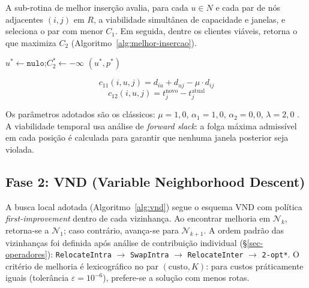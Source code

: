 \documentclass[10pt, a4paper]{article}
\begin{document}
A sub-rotina de melhor inser\c{c}\~ao avalia, para cada $u \in N$ e cada par de n\'os adjacentes $(i, j)$ em $R$, a viabilidade simult\^anea de capacidade e janelas, e seleciona o par com menor $C_1$. Em seguida, dentre os clientes vi\'aveis, retorna o que maximiza $C_2$ (Algoritmo~\ref{alg:melhor-insercao}).

\begin{algorithm}[H]
\caption{MelhorInser\c{c}\~ao --- Sub-rotina I1}
\label{alg:melhor-insercao}
$u^* \leftarrow \texttt{nulo}$;\quad $C_2^* \leftarrow -\infty$\;
\Return $(u^*, p^*)$\;
\end{algorithm}

\begin{equation}
c_{11}(i,u,j) = d_{iu} + d_{uj} - \mu \cdot d_{ij}
\label{eq:c11}
\end{equation}
\begin{equation}
c_{12}(i,u,j) = t_j^\text{novo} - t_j^\text{atual}
\label{eq:c12}
\end{equation}

Os par\^ametros adotados s\~ao os cl\'assicos: $\mu = 1{,}0$, $\alpha_1 = 1{,}0$, $\alpha_2 = 0{,}0$, $\lambda = 2{,}0$ \citep{solomon1987}. A viabilidade temporal usa an\'alise de \emph{forward slack}: a folga m\'axima admiss\'ivel em cada posi\c{c}\~ao \'e calculada para garantir que nenhuma janela posterior seja violada.

\subsection{Fase 2: VND (Variable Neighborhood Descent)}
\label{sec-vnd}

A busca local adotada (Algoritmo~\ref{alg:vnd}) segue o esquema VND \citep{hansen2001} com pol\'itica \emph{first-improvement} dentro de cada vizinhan\c{c}a. Ao encontrar melhoria em $\mathcal{N}_k$, retorna-se a $\mathcal{N}_1$; caso contr\'ario, avan\c{c}a-se para $\mathcal{N}_{k+1}$. A ordem padr\~ao das vizinhan\c{c}as foi definida ap\'os an\'alise de contribui\c{c}\~ao individual (\S\ref{sec-operadores}): \texttt{RelocateIntra} $\to$ \texttt{SwapIntra} $\to$ \texttt{RelocateInter} $\to$ \texttt{2-opt*}. O crit\'erio de melhoria \'e lexicogr\'afico no par $(\mathrm{custo}, K)$: para custos pr\'aticamente iguais (toler\^ancia $\varepsilon = 10^{-6}$), prefere-se a solu\c{c}\~ao com menos rotas.
\end{document}
